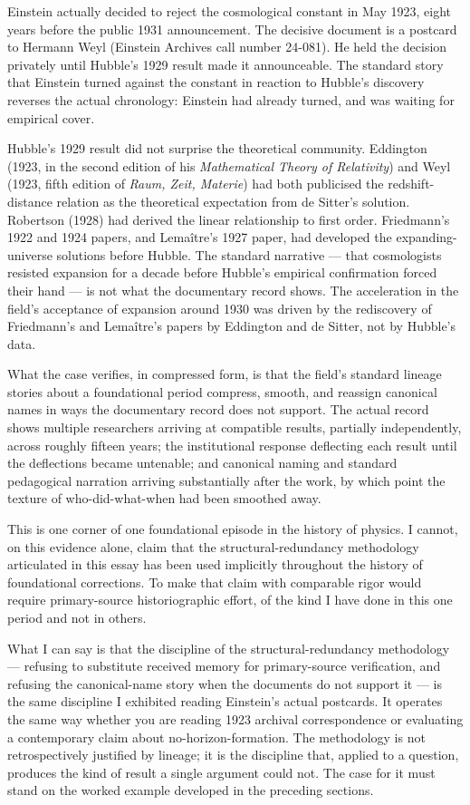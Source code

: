 \documentclass[11pt,a4paper]{article}
\begin{document}
Einstein actually decided to reject the cosmological constant in May 1923, eight years before the public 1931 announcement. The decisive document is a postcard to Hermann Weyl (Einstein Archives call number 24-081). He held the decision privately until Hubble's 1929 result made it announceable. The standard story that Einstein turned against the constant in reaction to Hubble's discovery reverses the actual chronology: Einstein had already turned, and was waiting for empirical cover.

Hubble's 1929 result did not surprise the theoretical community. Eddington (1923, in the second edition of his \textit{Mathematical Theory of Relativity}) and Weyl (1923, fifth edition of \textit{Raum, Zeit, Materie}) had both publicised the redshift-distance relation as the theoretical expectation from de Sitter's solution. Robertson (1928) had derived the linear relationship to first order. Friedmann's 1922 and 1924 papers, and Lema\^{i}tre's 1927 paper, had developed the expanding-universe solutions before Hubble. The standard narrative --- that cosmologists resisted expansion for a decade before Hubble's empirical confirmation forced their hand --- is not what the documentary record shows. The acceleration in the field's acceptance of expansion around 1930 was driven by the rediscovery of Friedmann's and Lema\^{i}tre's papers by Eddington and de Sitter, not by Hubble's data.

What the case verifies, in compressed form, is that the field's standard lineage stories about a foundational period compress, smooth, and reassign canonical names in ways the documentary record does not support. The actual record shows multiple researchers arriving at compatible results, partially independently, across roughly fifteen years; the institutional response deflecting each result until the deflections became untenable; and canonical naming and standard pedagogical narration arriving substantially after the work, by which point the texture of who-did-what-when had been smoothed away.

This is one corner of one foundational episode in the history of physics. I cannot, on this evidence alone, claim that the structural-redundancy methodology articulated in this essay has been used implicitly throughout the history of foundational corrections. To make that claim with comparable rigor would require primary-source historiographic effort, of the kind I have done in this one period and not in others.

What I can say is that the discipline of the structural-redundancy methodology --- refusing to substitute received memory for primary-source verification, and refusing the canonical-name story when the documents do not support it --- is the same discipline I exhibited reading Einstein's actual postcards. It operates the same way whether you are reading 1923 archival correspondence or evaluating a contemporary claim about no-horizon-formation. The methodology is not retrospectively justified by lineage; it is the discipline that, applied to a question, produces the kind of result a single argument could not. The case for it must stand on the worked example developed in the preceding sections.
\end{document}
